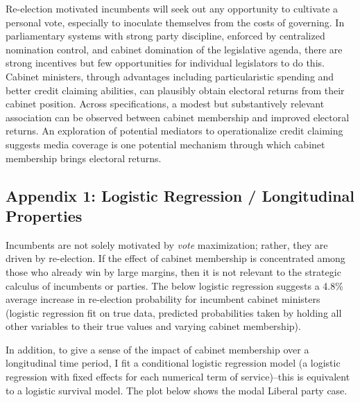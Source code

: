 \documentclass[letter,12pt]{article}
\begin{document}
Re-election motivated incumbents will seek out any opportunity to cultivate a personal vote, especially to inoculate themselves from the costs of governing. In parliamentary systems with strong party discipline, enforced by centralized nomination control, and cabinet domination of the legislative agenda, there are strong incentives but few opportunities for individual legislators to do this. Cabinet ministers, through advantages including particularistic spending and better credit claiming abilities, can plausibly obtain electoral returns from their cabinet position. Across specifications, a modest but substantively relevant association can be observed between cabinet membership and improved electoral returns. An exploration of potential mediators to operationalize credit claiming suggests media coverage is one potential mechanism through which cabinet membership brings electoral returns.

\newpage
{}

\subsection*{Appendix 1: Logistic Regression / Longitudinal Properties}
Incumbents are not solely motivated by \textit{vote} maximization; rather, they are driven by re-election. If the effect of cabinet membership is concentrated among those who already win by large margins, then it is not relevant to the strategic calculus of incumbents or parties. The below logistic regression suggests a 4.8\% average increase in re-election probability for incumbent cabinet ministers (logistic regression fit on true data, predicted probabilities taken by holding all other variables to their true values and varying cabinet membership).



In addition, to give a sense of the impact of cabinet membership over a longitudinal time period, I fit a conditional logistic regression model (a logistic regression with fixed effects for each numerical term of service)--this is equivalent to a logistic survival model. The plot below shows the modal Liberal party case. 
\end{document}
